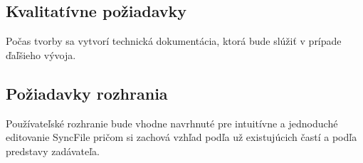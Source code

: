 \documentclass{article}
\begin{document}
\subsection{Kvalitatívne požiadavky}
Počas tvorby sa vytvorí technická dokumentácia, ktorá bude slúžiť v prípade ďaľšieho vývoja.

\subsection{Požiadavky rozhrania}
Používateľské rozhranie bude vhodne navrhnuté pre intuitívne a jednoduché editovanie SyncFile pričom si zachová vzhľad podľa už existujúcich častí a podľa predstavy zadávateľa.
\end{document}
